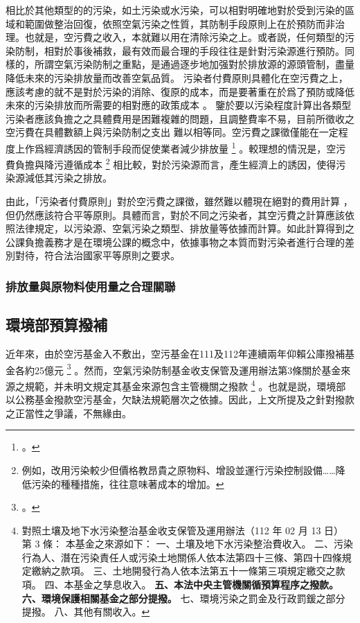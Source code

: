 \documentclass[12pt,a4paper]{article}
\begin{document}
相比於其他類型的的污染，如土污染或水污染，可以相對明確地對於受到污染的區域和範圍做整治回復，依照空氣污染之性質，其防制手段原則上在於預防而非治理。也就是，空污費之收入，本就難以用在清除污染之上。或者説，任何類型的污染防制，相對於事後補救，最有效而最合理的手段往往是針對污染源進行預防。同樣的，所謂空氣污染防制之重點，是通過逐步地加强對於排放源的源頭管制，盡量降低未來的污染排放量而改善空氣品質。
污染者付費原則具體化在空污費之上，應該考慮的就不是對於污染的消除、復原的成本，而是要著重在於爲了預防或降低未來的污染排放而所需要的相對應的政策成本
。
鑒於要以污染程度計算出各類型污染者應該負擔之之具體費用是困難複雜的問題，且調整費率不易，目前所徵收之空污費在具體數額上與污染防制之支出
難以相等同。空污費之課徵僅能在一定程度上作爲經濟誘因的管制手段而促使業者減少排放量
\footnote{。}
。較理想的情況是，空污費負擔與降污遵循成本
\footnote{例如，改用污染較少但價格教昂貴之原物料、增設並運行污染控制設備……降低污染的種種措施，往往意味著成本的增加。}
相比較，對於污染源而言，產生經濟上的誘因，使得污染源減低其污染之排放。

由此，「污染者付費原則」對於空污費之課徵，雖然難以體現在絕對的費用計算
，但仍然應該符合平等原則。具體而言，對於不同之污染者，其空污費之計算應該依照法律規定，以污染源、空氣污染之類型、排放量等依據而計算。如此計算得到之公課負擔義務才是在環境公課的概念中，依據事物之本質而對污染者進行合理的差別對待，符合法治國家平等原則之要求。


\subsubsection{排放量與原物料使用量之合理關聯}

\subsection{環境部預算撥補}

近年來，由於空污基金入不敷出，空污基金在111及112年連續兩年仰賴公庫撥補基金各約25億元
\footnote{。}
。然而，空氣污染防制基金收支保管及運用辦法第3條關於基金來源之規範，并未明文規定其基金來源包含主管機關之撥款
\footnote{
對照土壤及地下水污染整治基金收支保管及運用辦法（112 年 02 月 13 日）
第 3 條：
本基金之來源如下：
一、土壤及地下水污染整治費收入。
二、污染行為人、潛在污染責任人或污染土地關係人依本法第四十三條、第四十四條規定繳納之款項。
三、土地開發行為人依本法第五十一條第三項規定繳交之款項。
四、本基金之孳息收入。
\textbf{五、本法中央主管機關循預算程序之撥款。
六、環境保護相關基金之部分提撥。}
七、環境污染之罰金及行政罰鍰之部分提撥。
八、其他有關收入。}
。也就是説，環境部以公務基金撥款空污基金，欠缺法規範層次之依據。因此，上文所提及之針對撥款之正當性之爭議，不無緣由。
\end{document}
